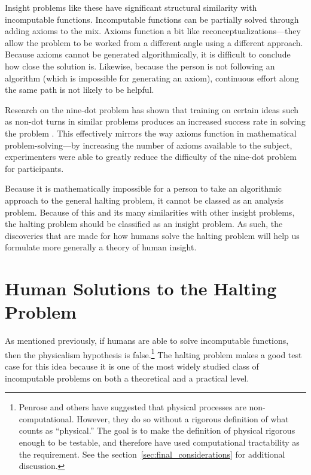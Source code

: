 Insight problems like these have significant structural similarity with incomputable functions.  Incomputable functions can be partially solved through adding axioms to the mix.  Axioms function a bit like reconceptualizations---they allow the problem to be worked from a different angle using a different approach.  Because axioms cannot be generated algorithmically, it is difficult to conclude how close the solution is.  Likewise, because the person is not following an algorithm (which is impossible for generating an axiom), continuous effort along the same path is not likely to be helpful.

Research on the nine-dot problem has shown that training on certain ideas such as non-dot turns in similar problems produces an increased success rate in solving the problem \citep{kershawandohlsson2001, kershaw2004}.  This effectively mirrors the way axioms function in mathematical problem-solving---by increasing the number of axioms available to the subject, experimenters were able to greatly reduce the difficulty of the nine-dot problem for participants.

Because it is mathematically impossible for a person to take an algorithmic approach to the general halting problem, it cannot be classed as an analysis problem.  Because of this and its many similarities with other insight problems, the halting problem should be classified as an insight problem.  As such, the discoveries that are made for how humans solve the halting problem will help us formulate more generally a theory of human insight.

\section{Human Solutions to the Halting Problem}

As mentioned previously, if humans are able to solve incomputable functions, then the physicalism hypothesis is false.\footnote{Penrose and others have suggested that physical processes are non-computational.  However, they do so without a rigorous definition of what counts as ``physical.''  The goal is to make the definition of physical rigorous enough to be testable, and therefore have used computational tractability as the requirement.  See the section~\ref{sec:final_considerations} for additional discussion.}  The halting problem makes a good test case for this idea because it is one of the most widely studied class of incomputable problems on both a theoretical and a practical level.

